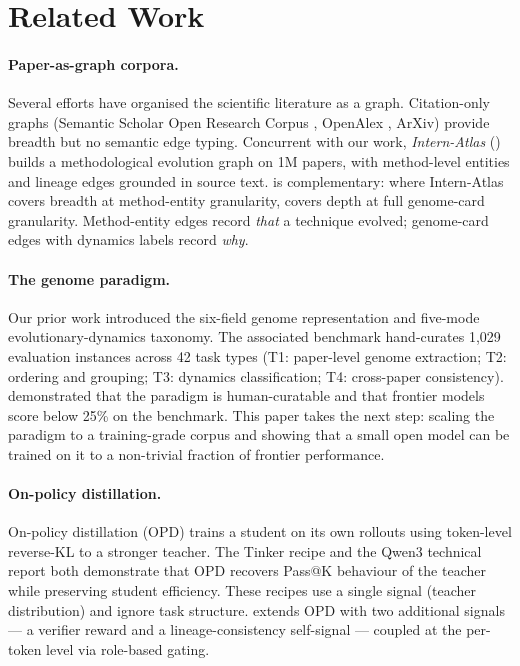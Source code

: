 \section{Related Work}
\label{sec:related}

\paragraph{Paper-as-graph corpora.} Several efforts have organised the
scientific literature as a graph. Citation-only graphs (Semantic Scholar
Open Research Corpus , OpenAlex , ArXiv) provide
breadth but no semantic edge typing. Concurrent with our work,
\emph{Intern-Atlas} () builds a methodological
evolution graph on 1M papers, with method-level entities and lineage edges
grounded in source text. \genetrace{} is complementary: where Intern-Atlas
covers breadth at method-entity granularity, \genetrace{} covers depth at
full genome-card granularity. Method-entity edges record \emph{that} a
technique evolved; genome-card edges with dynamics labels record
\emph{why}.

\paragraph{The genome paradigm.} Our prior work \ideaevolving{}
\citep{ideaevolving2025} introduced the six-field genome representation and
five-mode evolutionary-dynamics taxonomy. The associated \geneexam{}
benchmark hand-curates 1{,}029 evaluation instances across 42 task types
(T1: paper-level genome extraction; T2: ordering and grouping; T3:
dynamics classification; T4: cross-paper consistency). \ideaevolving{}
demonstrated that the paradigm is human-curatable and that frontier models
score below 25\% on the benchmark. This paper takes the next step: scaling
the paradigm to a training-grade corpus and showing that a small open
model can be trained on it to a non-trivial fraction of frontier
performance.

\paragraph{On-policy distillation.} On-policy distillation (OPD) trains a
student on its own rollouts using token-level reverse-KL to a stronger
teacher. The Tinker recipe \citep{tinker_opd_2025} and the Qwen3 technical
report \citep{qwen3_2025} both demonstrate that OPD recovers Pass@K
behaviour of the teacher while preserving student efficiency. These
recipes use a single signal (teacher distribution) and ignore task
structure. \evoopd{} extends OPD with two additional signals --- a
verifier reward and a lineage-consistency self-signal --- coupled at the
per-token level via role-based gating.

